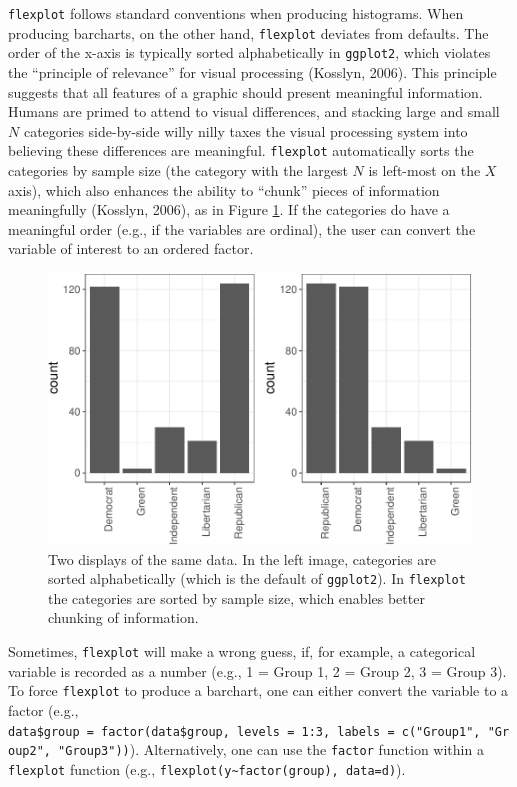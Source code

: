 \documentclass[
  english,
  man]{apa6}
\begin{document}
\normalsize

\texttt{flexplot} follows standard conventions when producing histograms. When producing barcharts, on the other hand, \texttt{flexplot} deviates from defaults. The order of the x-axis is typically sorted alphabetically in \texttt{ggplot2}, which violates the ``principle of relevance'' for visual processing (Kosslyn, 2006). This principle suggests that all features of a graphic should present meaningful information. Humans are primed to attend to visual differences, and stacking large and small \(N\) categories side-by-side willy nilly taxes the visual processing system into believing these differences are meaningful. \texttt{flexplot} automatically sorts the categories by sample size (the category with the largest \(N\) is left-most on the \(X\) axis), which also enhances the ability to ``chunk'' pieces of information meaningfully (Kosslyn, 2006), as in Figure \ref{fig:chunkit}. If the categories do have a meaningful order (e.g., if the variables are ordinal), the user can convert the variable of interest to an ordered factor.

\small

\begin{figure}
\centering
\includegraphics{flexplot_psychmeth_files/figure-latex/chunkit-1.pdf}
\caption{\label{fig:chunkit}Two displays of the same data. In the left image, categories are sorted alphabetically (which is the default of \texttt{ggplot2}). In \texttt{flexplot} the categories are sorted by sample size, which enables better chunking of information. \label{fig:chunkit}}
\end{figure}

\normalsize

Sometimes, \texttt{flexplot} will make a wrong guess, if, for example, a categorical variable is recorded as a number (e.g., 1 = Group 1, 2 = Group 2, 3 = Group 3). To force \texttt{flexplot} to produce a barchart, one can either convert the variable to a factor (e.g., \texttt{data\$group\ =\ factor(data\$group,\ levels\ =\ 1:3,\ labels\ =\ c("Group1",\ "Group2",\ "Group3"))}). Alternatively, one can use the \texttt{factor} function within a \texttt{flexplot} function (e.g., \texttt{flexplot(y\textasciitilde{}factor(group),\ data=d)}).
\end{document}
